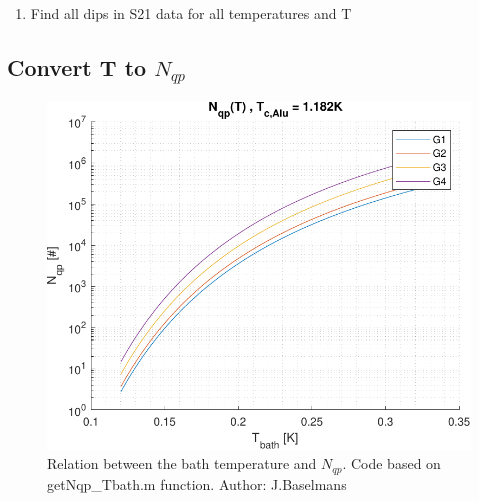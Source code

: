\begin{enumerate}
	\item Find all dips in S21 data for all temperatures and T
\end{enumerate}


\subsection*{Convert T to $N_{qp}$}

\begin{figure}[ht]
	\centering
	\includegraphics[width=\linewidth]{figures/ch5_measurement/N_qp_funcT.pdf}
	\caption{Relation between the bath temperature and $N_{qp}$. Code based on getNqp\_Tbath.m function. Author: J.Baselmans}
	\label{fig:}
\end{figure}

